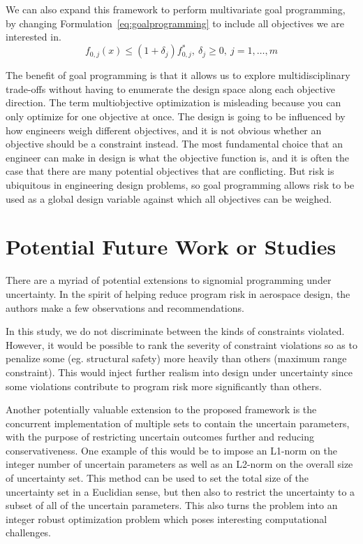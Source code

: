 We can also expand this framework to perform multivariate goal programming,
by changing Formulation~\ref{eq:goalprogramming} to include all
objectives we are interested in.
\begin{equation}
    f_{0,j}(x) \leq (1+\delta_j) f^*_{0,j},~\delta_j \geq 0,~j = 1,\ldots, m
    \label{eq:multigoal}
\end{equation}

The benefit of goal programming is that it allows us to explore multidisciplinary trade-offs without
having to enumerate the design space along each objective direction.
The term multiobjective optimization is misleading
because you can only optimize for one objective at once.
The design is going to be influenced by how engineers weigh different objectives, and
it is not obvious whether an objective should be a constraint instead. The most
fundamental choice that an engineer can make in design is what the objective function is, and it is
often the case that there are many potential objectives that are conflicting.
But risk is ubiquitous in engineering design problems, so goal programming allows risk to be used as
a global design variable against which all objectives can be weighed.

\section{Potential Future Work or Studies}

There are a myriad of potential extensions to signomial programming under uncertainty.
In the spirit of helping reduce program risk in aerospace design,
the authors make a few observations and recommendations.

In this study, we do not discriminate between the kinds of constraints violated. However, it would
be possible to rank the severity of constraint violations so as to penalize some (eg. structural safety)
more heavily than others (maximum range constraint). This would inject further realism into
design under uncertainty since some violations contribute to program risk more
significantly than others.

Another potentially valuable extension to the proposed framework is the concurrent implementation
of multiple sets to contain the uncertain parameters, with the purpose of restricting uncertain
outcomes further and reducing conservativeness.
One example of this would be to impose an  L1-norm on the integer number of uncertain parameters
as well as an L2-norm on the overall size of uncertainty set.
This method can be used to set the total size of the uncertainty set in a Euclidian sense,
but then also to restrict the uncertainty to a subset of all of the uncertain parameters.
This also turns the problem into an integer robust
optimization problem which poses interesting computational challenges.

